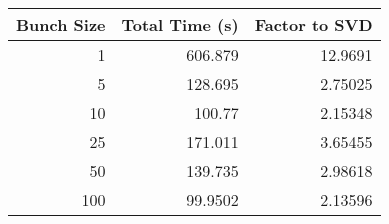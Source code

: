 \begin{tabular}{rrr}
\toprule
   Bunch Size &   Total Time (s) &   Factor to SVD \\
\midrule
            1 &         606.879  &        12.9691  \\
            5 &         128.695  &         2.75025 \\
           10 &         100.77   &         2.15348 \\
           25 &         171.011  &         3.65455 \\
           50 &         139.735  &         2.98618 \\
          100 &          99.9502 &         2.13596 \\
\bottomrule
\end{tabular}